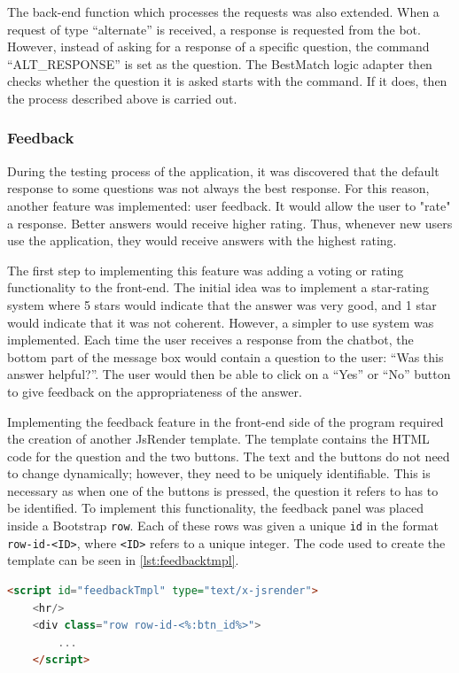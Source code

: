\documentclass[12pt,a4paper]{article}
\newcommand{\captionstyle}[1] {
    \small{#1}
}
\begin{document}
The back-end function which processes the requests was also extended. When a request of type “alternate” is received, a response is requested from the bot. However, instead of asking for a response of a specific question, the command “ALT\_RESPONSE” is set as the question.  The BestMatch logic adapter then checks whether the question it is asked starts with the command. If it does, then the process described above is carried out.

\subsubsection{Feedback}
During the testing process of the application, it was discovered that the default response to some questions was not always the best response.  For this reason, another feature was implemented: user feedback. It would allow the user to "rate" a response. Better answers would receive higher rating. Thus, whenever new users use the application, they would receive answers with the highest rating.

The first step to implementing this feature was adding a voting or rating functionality to the front-end. The initial idea was to implement a star-rating system where 5 stars would indicate that the answer was very good, and 1 star would indicate that it was not coherent. However, a simpler to use system was implemented. Each time the user receives a response from the chatbot, the bottom part of the message box would contain a question to the user: “Was this answer helpful?”. The user would then be able to click on a “Yes” or “No” button to give feedback on the appropriateness of the answer. 

Implementing the feedback feature in the front-end side of the program required the creation of another JsRender template. The template contains the HTML code for the question and the two buttons. The text and the buttons do not need to change dynamically; however, they need to be uniquely identifiable. This is necessary as when one of the buttons is pressed, the question it refers to has to be identified. To implement this functionality, the feedback panel was placed inside a Bootstrap \texttt{row}. Each of these rows was given a unique \texttt{id} in the format \texttt{row-id-<ID>}, where \texttt{<ID>} refers to a unique integer. The code used to create the template can be seen in \cref{lst:feedbacktmpl}. 

\begin{lstlisting}[language=html, caption={\captionstyle{The JsRender template used to generate HTML code for a feedback panel.}}, label={lst:feedbacktmpl}]
    <script id="feedbackTmpl" type="text/x-jsrender">
    <hr/>
    <div class="row row-id-<%:btn_id%>">
        ...
    </script>
    \end{lstlisting}
\end{document}
